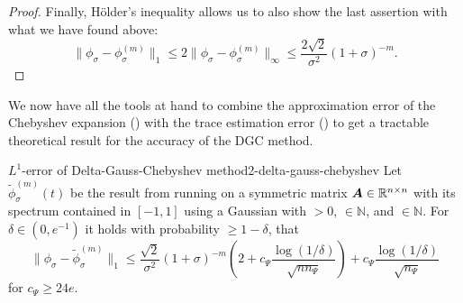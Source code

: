 \begin{proof}
    Finally, H\"older's inequality \cite{klenke2013probability} 
    allows us to also show the last assertion with what we have found above:
    \begin{equation}
        \lVert \phi_{\sigma} - \phi_{\sigma}^{(m)} \rVert _1
            \leq 2 \lVert \phi_{\sigma} - \phi_{\sigma}^{(m)} \rVert _{\infty}
            \leq \frac{2\sqrt{2}}{\sigma^2} (1 + \sigma)^{-m}.
    \end{equation}
\end{proof}

We now have all the tools at hand to combine the approximation error of the
Chebyshev expansion () with the trace estimation
error () to get a tractable theoretical
result for the accuracy of the \gls{DGC} method.

\begin{theorem}{$L^1$-error of Delta-Gauss-Chebyshev method}{2-delta-gauss-chebyshev}
    Let $\widetilde{\phi}_{\sigma}^{(m)}(t)$ be the result from running 
    on a symmetric matrix $\boldsymbol{A} \in \mathbb{R}^{n \times n}$ with its spectrum contained in $[-1, 1]$ using
    a Gaussian  with
     $>0$,  $\in \mathbb{N}$, and
     $\in \mathbb{N}$. For $\delta \in (0, e^{-1})$ it holds with
    probability $\geq 1-\delta$, that
    \begin{equation}
        \lVert \phi_{\sigma} - \widetilde{\phi}_{\sigma}^{(m)}\rVert _1
        \leq \frac{\sqrt{2}}{\sigma^2} (1 + \sigma)^{-m} \left( 2 + c_{\Psi} \frac{\log(1/\delta)}{\sqrt{n n_{\Psi}}} \right) + c_{\Psi} \frac{\log(1/\delta)}{\sqrt{n_{\Psi}}}
    \end{equation}
    for $c_{\Psi} \geq 24e$.
\end{theorem}

